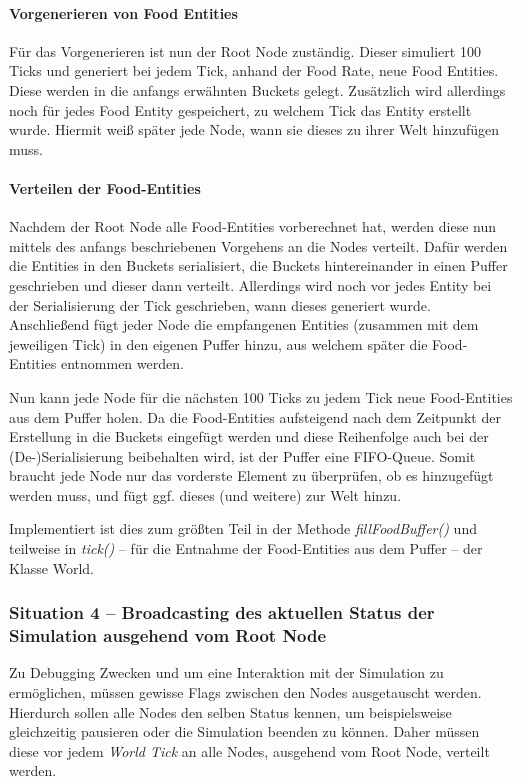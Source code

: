 \documentclass[course=erap]{aspdoc}
\begin{document}
\paragraph{Vorgenerieren von Food Entities}
Für das Vorgenerieren ist nun der Root Node zuständig. Dieser simuliert 100 Ticks und generiert bei jedem Tick, anhand der Food Rate, neue Food Entities. Diese werden in die anfangs erwähnten Buckets gelegt. Zusätzlich wird allerdings noch für jedes Food Entity gespeichert, zu welchem Tick das Entity erstellt wurde. Hiermit weiß später jede Node, wann sie dieses zu ihrer Welt hinzufügen muss.


\paragraph{Verteilen der Food-Entities}
Nachdem der Root Node alle Food-Entities vorberechnet hat, werden diese nun mittels des anfangs beschriebenen Vorgehens an die Nodes verteilt. Dafür werden die Entities in den Buckets serialisiert, die Buckets hintereinander in einen Puffer geschrieben und dieser dann verteilt. Allerdings wird noch vor jedes Entity bei der Serialisierung der Tick geschrieben, wann dieses generiert wurde. Anschließend fügt jeder Node die empfangenen Entities (zusammen mit dem jeweiligen Tick) in den eigenen Puffer hinzu, aus welchem später die Food-Entities entnommen werden.

Nun kann jede Node für die nächsten 100 Ticks zu jedem Tick neue Food-Entities aus dem Puffer holen. Da die Food-Entities aufsteigend nach dem Zeitpunkt der Erstellung in die Buckets eingefügt werden und diese Reihenfolge auch bei der (De-)Serialisierung beibehalten wird, ist der Puffer eine FIFO-Queue. Somit braucht jede Node nur das vorderste Element zu überprüfen, ob es hinzugefügt werden muss, und fügt ggf. dieses (und weitere) zur Welt hinzu.

Implementiert ist dies zum größten Teil in der Methode \emph{fillFoodBuffer()} und teilweise in \emph{tick()} -- für die Entnahme der Food-Entities aus dem Puffer -- der Klasse World.


\subsubsection{Situation 4 -- Broadcasting des aktuellen Status der Simulation ausgehend vom Root Node}
Zu Debugging Zwecken und um eine Interaktion mit der Simulation zu ermöglichen, müssen gewisse Flags zwischen den Nodes ausgetauscht werden. Hierdurch sollen alle Nodes den selben Status kennen, um beispielsweise gleichzeitig pausieren oder die Simulation beenden zu können. Daher müssen diese vor jedem \emph{World Tick} an alle Nodes, ausgehend vom Root Node, verteilt werden.
\end{document}
